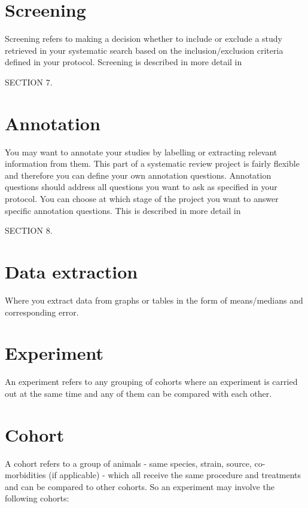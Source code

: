 \documentclass[
]{book}
\begin{document}
\hypertarget{screening}{%
\section{Screening}\label{screening}}

Screening refers to making a decision whether to include or exclude a study retrieved in your systematic search based on the inclusion/exclusion criteria defined in your protocol. Screening is described in more detail in

SECTION 7.

\hypertarget{annotation}{%
\section{Annotation}\label{annotation}}

You may want to annotate your studies by labelling or extracting relevant information from them. This part of a systematic review project is fairly flexible and therefore you can define your own annotation questions. Annotation questions should address all questions you want to ask as specified in your protocol. You can choose at which stage of the project you want to answer specific annotation questions. This is described in more detail in

SECTION 8.

\hypertarget{data-extraction}{%
\section{Data extraction}\label{data-extraction}}

Where you extract data from graphs or tables in the form of means/medians and corresponding error.

\hypertarget{experiment}{%
\section{Experiment}\label{experiment}}

An experiment refers to any grouping of cohorts where an experiment is carried out at the same time and any of them can be compared with each other.

\hypertarget{cohort}{%
\section{Cohort}\label{cohort}}

A cohort refers to a group of animals - same species, strain, source, co-morbidities (if applicable) - which all receive the same procedure and treatments and can be compared to other cohorts. So an experiment may involve the following cohorts:
\end{document}
